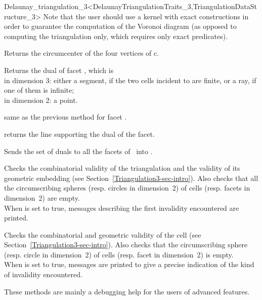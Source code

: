 \begin{ccRefClass}{Delaunay_triangulation_3<DelaunayTriangulationTraits_3,TriangulationDataStructure_3>}
Note that the user should use a kernel with exact constructions in order
to guarantee the computation of the Voronoi diagram (as opposed to computing
the triangulation only, which requires only exact predicates).

{Returns the circumcenter of the four vertices of c.
}

{Returns the dual of facet , which is \\
in dimension 3: either a segment, if the two cells incident to   
are finite, or a ray, if one of them is infinite;\\
in dimension 2: a point.
}

{same as the previous method for facet .}

{returns the line supporting the dual of the facet.
}

{Sends the set of duals to all the facets of \ccVar\ into .}


\begin{ccAdvanced}
{Checks the combinatorial validity of the triangulation and the
validity of its geometric embedding (see
Section~\ref{Triangulation3-sec-intro}). Also checks that all the
circumscribing spheres (resp. circles in dimension~2) of  cells
(resp. facets in dimension~2) are empty.\\ When  is set to
true,  messages describing the first invalidity encountered are
printed.}

{Checks the combinatorial and geometric validity of the cell (see
Section~\ref{Triangulation3-sec-intro}). Also checks that the
circumscribing sphere (resp. circle in dimension~2) of  cells
(resp. facet in dimension~2) is empty.\\
 When  is set to
true, messages are printed to give
a precise indication of the kind of invalidity encountered.}

These methods are  mainly a debugging help for the users of advanced features.
\end{ccAdvanced}

\ccSeeAlso


\end{ccRefClass}
